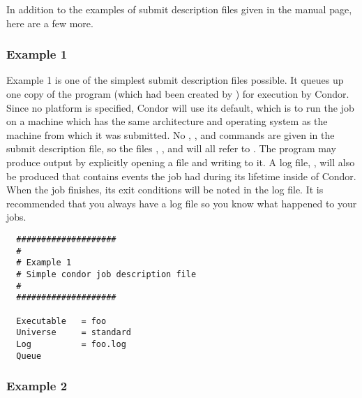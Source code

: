 In addition to the examples of submit description files given
in the 
 manual page, here are a few more.

\subsubsection{Example 1} 

Example 1 is one of the simplest submit description
files possible. It queues up one copy of the program 
(which had been created by )
for execution by Condor.
Since no platform is specified, Condor will use its default,
which is to run the job on a machine which has the
same architecture and operating system as the machine from which it was
submitted. 
No 
,
, and
commands are given in the submit
description file, so the
files , , and  will all refer to 
.
The program may produce output by explicitly opening a file and writing to
it.
A log file, , will also be produced that contains events
the job had during its lifetime inside of Condor.
When the job finishes, its exit conditions will be noted in the log file.
It is recommended that you always have a log file so you know what
happened to your jobs.
\begin{verbatim}
  ####################                                                    
  # 
  # Example 1                                                            
  # Simple condor job description file                                    
  #                                                                       
  ####################                                                    
                                                                          
  Executable   = foo                                                    
  Universe     = standard                                                    
  Log          = foo.log                                                    
  Queue    
\end{verbatim}

\subsubsection{Example 2}

